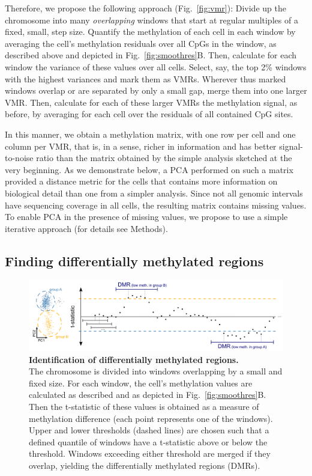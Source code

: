 \documentclass[twocolumn,10pt]{article}
\begin{document}
Therefore, we propose the following approach (Fig.~\ref{fig:vmr}): Divide up the chromosome into many \emph{overlapping} windows that start at regular multiples of a fixed, small, step size.
Quantify the methylation of each cell in each window by averaging the cell's methylation residuals over all CpGs in the window, as described above and depicted in Fig.~\ref{fig:smoothres}B.
Then, calculate for each window the variance of these values over all cells.
Select, say, the top 2\% windows with the highest variances and mark them as VMRs.
Wherever thus marked windows overlap or are separated by only a small gap, merge them into one larger VMR.
Then, calculate for each of these larger VMRs the methylation signal, as before, by averaging for each cell over the residuals of all contained CpG sites.

In this manner, we obtain a methylation matrix, with one row per cell and one column per VMR, that is, in a sense, richer in information and has better signal-to-noise ratio than the matrix obtained by the simple analysis sketched at the very beginning.
As we demonstrate below, a PCA performed on such a matrix provided a distance metric for the cells that contains more information on biological detail than one from a simpler analysis.
Since not all genomic intervals have sequencing coverage in all cells, the resulting matrix contains missing values.
To enable PCA in the presence of missing values, we propose to use a simple iterative approach (for details see Methods).

\subsection{Finding differentially methylated regions}

\begin{figure}
    \begin{center}
    \includegraphics[width=.65\textwidth]{figures/Fig_DMRdetection.png}
    \end{center}
    \caption{\small \textbf{Identification of differentially methylated regions.}\\
    The chromosome is divided into windows overlapping by a small and fixed size.
    For each window, the cell’s methylation values are calculated as described and as depicted in Fig.~\ref{fig:smoothres}B.
    Then the t-statistic of these values is obtained as a measure of methylation difference (each point represents one of the windows).
    Upper and lower thresholds (dashed lines) are chosen such that a defined quantile of windows have a t-statistic above or below the threshold.
    Windows exceeding either threshold are merged if they overlap, yielding the differentially methylated regions (DMRs).}
    \label{fig:dmrscan}
\end{figure}
\end{document}
